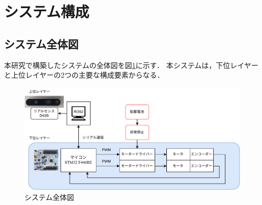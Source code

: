 \section{システム構成}
\subsection{システム全体図}
本研究で構築したシステムの全体図を図\ref{fig:system_diagram}に示す．
本システムは，下位レイヤーと上位レイヤーの2つの主要な構成要素からなる．

\begin{figure}[h]
    \centering
    \includegraphics[width=1.0\textwidth]{figure/system.pdf}
    \caption{システム全体図}
    \label{fig:system_diagram}
\end{figure}

